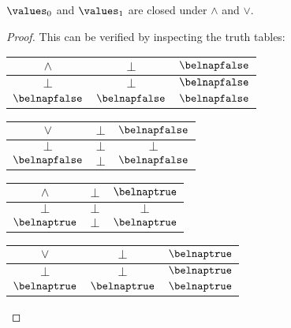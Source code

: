 \begin{lemma}
    \(\values_0\) and \(\values_1\) are closed under \(\land\) and \(\lor\).
\end{lemma}
\begin{proof}
    This can be verified by inspecting the truth tables:

    \begin{center}
        \begin{tabular}{|c|cc|}
            \hline
            \(\land\)        & \(\bot\)         & \(\belnapfalse\) \\
            \hline
            \(\bot\)         & \(\bot\)         & \(\belnapfalse\) \\
            \(\belnapfalse\) & \(\belnapfalse\) & \(\belnapfalse\) \\
            \hline
        \end{tabular}
        \quad
        \begin{tabular}{|c|cc|}
            \hline
            \(\lor\)         & \(\bot\) & \(\belnapfalse\) \\
            \hline
            \(\bot\)         & \(\bot\) & \(\bot\)         \\
            \(\belnapfalse\) & \(\bot\) & \(\belnapfalse\) \\
            \hline
        \end{tabular}
        \quad
        \begin{tabular}{|c|cc|}
            \hline
            \(\land\)       & \(\bot\) & \(\belnaptrue\) \\
            \hline
            \(\bot\)        & \(\bot\) & \(\bot\)        \\
            \(\belnaptrue\) & \(\bot\) & \(\belnaptrue\) \\
            \hline
        \end{tabular}
        \quad
        \begin{tabular}{|c|cc|}
            \hline
            \(\lor\)        & \(\bot\)        & \(\belnaptrue\) \\
            \hline
            \(\bot\)        & \(\bot\)        & \(\belnaptrue\) \\
            \(\belnaptrue\) & \(\belnaptrue\) & \(\belnaptrue\) \\
            \hline
        \end{tabular}
    \end{center}

    \qedhere
\end{proof}

